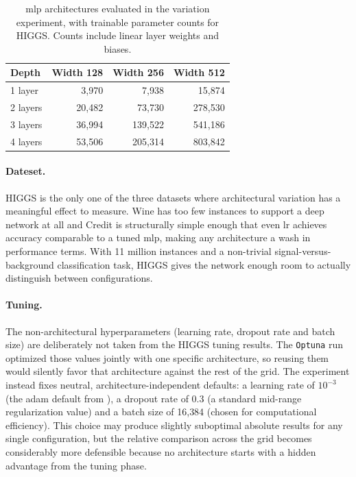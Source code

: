 \begin{table}[htbp]
\centering
\caption[\gls{mlp} architecture variation: configurations and parameter counts.]{\gls{mlp} architectures evaluated in the variation experiment, with trainable parameter counts for HIGGS. Counts include linear layer weights and biases.}
\label{tab:mlp_architectures}
\begin{tabular}{lrrr}
\toprule
\textbf{Depth} & \textbf{Width 128} & \textbf{Width 256} & \textbf{Width 512} \\
\midrule
1 layer  &   3{,}970 &   7{,}938 &  15{,}874 \\
2 layers &  20{,}482 &  73{,}730 & 278{,}530 \\
3 layers &  36{,}994 & 139{,}522 & 541{,}186 \\
4 layers &  53{,}506 & 205{,}314 & 803{,}842 \\
\bottomrule
\end{tabular}
\end{table}

\paragraph{Dateset.}
HIGGS is the only one of the three datasets where architectural variation has a meaningful effect to measure. Wine has too few instances to support a deep network at all and Credit is structurally simple enough that even \gls{lr} achieves accuracy comparable to a tuned \gls{mlp}, making any architecture a wash in performance terms. With 11 million instances and a non-trivial signal-versus-background classification task, HIGGS gives the network enough room to actually distinguish between configurations.

\paragraph{Tuning.}
The non-architectural hyperparameters (learning rate, dropout rate and batch size) are deliberately not taken from the HIGGS tuning results. The \texttt{Optuna} run optimized those values jointly with one specific architecture, so reusing them would silently favor that architecture against the rest of the grid. The experiment instead fixes neutral, architecture-independent defaults: a learning rate of $10^{-3}$ (the \gls{adam} default from \citeauthor{kingmaAdamMethodStochastic2015} \cite{kingmaAdamMethodStochastic2015}), a dropout rate of $0.3$ (a standard mid-range regularization value) and a batch size of 16{,}384 (chosen for computational efficiency). This choice may produce slightly suboptimal absolute results for any single configuration, but the relative comparison across the grid becomes considerably more defensible because no architecture starts with a hidden advantage from the tuning phase.

